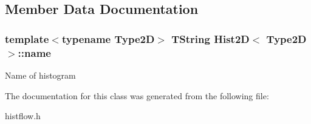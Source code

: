 \subsection{Member Data Documentation}
\subsubsection[{\texorpdfstring{name}{name}}]{\setlength{\rightskip}{0pt plus 5cm}template$<$typename Type2D$>$ T\+String {\bf Hist2D}$<$ Type2D $>$\+::name}\hypertarget{classHist2D_ac84b99dc72ad3d9f85a46f7620ce1740}{}\label{classHist2D_ac84b99dc72ad3d9f85a46f7620ce1740}
Name of histogram 

The documentation for this class was generated from the following file\+:\begin{DoxyCompactItemize}
\item 
histflow.\+h\end{DoxyCompactItemize}
